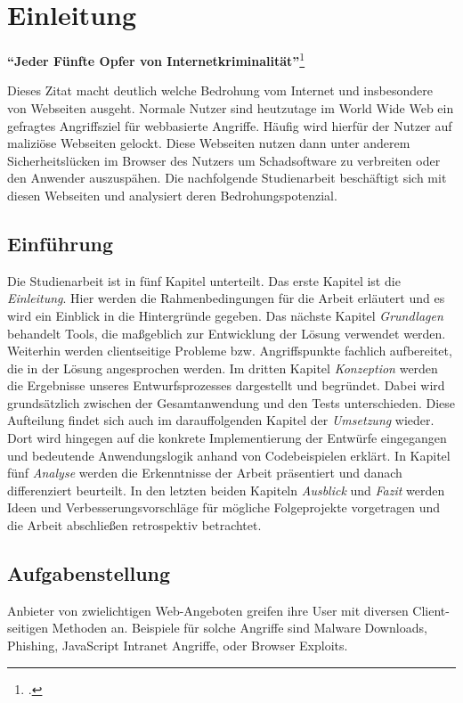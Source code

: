 \chapter{Einleitung}

\begin{center}
\textbf{\enquote{Jeder Fünfte Opfer von Internetkriminalität}}\footcite[Zitat][297]{cybercrime}
\end{center}

Dieses Zitat macht deutlich welche Bedrohung vom Internet und insbesondere von Webseiten ausgeht. Normale Nutzer sind heutzutage im World Wide Web ein gefragtes Angriffsziel für webbasierte Angriffe. Häufig wird hierfür der Nutzer auf maliziöse Webseiten gelockt. Diese Webseiten nutzen dann unter anderem Sicherheitslücken im Browser des Nutzers um Schadsoftware zu verbreiten oder den Anwender auszuspähen. Die nachfolgende Studienarbeit beschäftigt sich mit diesen Webseiten und analysiert deren Bedrohungspotenzial.

\section{Einführung}

Die Studienarbeit ist in fünf Kapitel unterteilt.
Das erste Kapitel ist die \textit{Einleitung}. Hier werden die Rahmenbedingungen für die Arbeit erläutert und es wird ein Einblick in die Hintergründe gegeben.
Das nächste Kapitel \textit{Grundlagen} behandelt Tools, die maßgeblich zur Entwicklung der Lösung verwendet werden.
Weiterhin werden clientseitige Probleme bzw. Angriffspunkte fachlich aufbereitet, die in der Lösung angesprochen werden.
Im dritten Kapitel \textit{Konzeption} werden die Ergebnisse unseres Entwurfsprozesses dargestellt und begründet.
Dabei wird grundsätzlich zwischen der Gesamtanwendung und den Tests unterschieden.
Diese Aufteilung findet sich auch im darauffolgenden Kapitel der \textit{Umsetzung} wieder.
Dort wird hingegen auf die konkrete Implementierung der Entwürfe eingegangen und bedeutende Anwendungslogik anhand von Codebeispielen erklärt.
In Kapitel fünf \textit{Analyse} werden die Erkenntnisse der Arbeit präsentiert und danach differenziert beurteilt.
In den letzten beiden Kapiteln \textit{Ausblick} und \textit{Fazit} werden Ideen und Verbesserungsvorschläge für mögliche Folgeprojekte vorgetragen und die Arbeit abschließen retrospektiv betrachtet.

\section{Aufgabenstellung}
Anbieter von zwielichtigen Web-Angeboten greifen ihre User mit diversen Client-seitigen Methoden an. Beispiele für solche Angriffe sind Malware Downloads, Phishing, JavaScript Intranet Angriffe, oder Browser Exploits.

